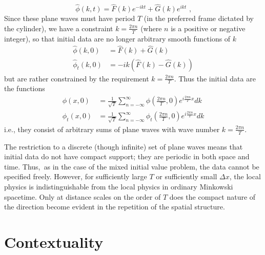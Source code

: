 \documentclass[12pt]{article}%
\begin{document}
\begin{equation}
\hat{\phi}(k,t)=\hat{F}(k)e^{-ikt}+\hat{G}(k)e^{ikt}\text{ ,}%
\end{equation}
Since these plane waves must have period $T$ (in the preferred frame dictated
by the cylinder), we have a constraint $k=\frac{2\pi n}{T}$ (where $n$ is a
positive or negative integer), so that initial data are no longer arbitrary
smooth functions of $k$
\begin{align*}
\hat{\phi}(k,0)  &  =\hat{F}(k)+\hat{G}(k)\\
\hat{\phi}_{t}(k,0)  &  =-ik(\hat{F}(k)-\hat{G}(k))
\end{align*}
but are rather constrained by the requirement $k=\frac{2\pi n}{T}$. Thus the
initial data are the functions%
\begin{align*}
\phi(x,0)  &  =\frac{1}{\sqrt{T}}%
{\displaystyle\sum\limits_{n=-\infty}^{\infty}}
\hat{\phi}(\frac{2\pi n}{T},0)e^{i\frac{2\pi n}{T}x}dk\\
\phi_{t}(x,0)  &  =\frac{1}{\sqrt{T}}%
{\displaystyle\sum\limits_{n=-\infty}^{\infty}}
\hat{\phi}_{t}(\frac{2\pi n}{T},0)e^{i\frac{2\pi n}{T}x}dk
\end{align*}
i.e., they consist of arbitrary sums of plane waves with wave number
$k=\frac{2\pi n}{T}.$

The restriction to a discrete (though infinite) set of plane waves means that
initial data do not have compact support; they are periodic in both space and
time. Thus,\emph{\ }as in the case of the mixed initial value problem, the
data cannot be specified freely. However, for sufficiently large $T$ or
sufficiently small $\Delta x$, the local physics is indistinguishable from the
local physics in ordinary Minkowski spacetime. Only at distance scales on the
order of $T$ does the compact nature of the direction become evident in the
repetition of the spatial structure.

\section{Contextuality}
\end{document}

